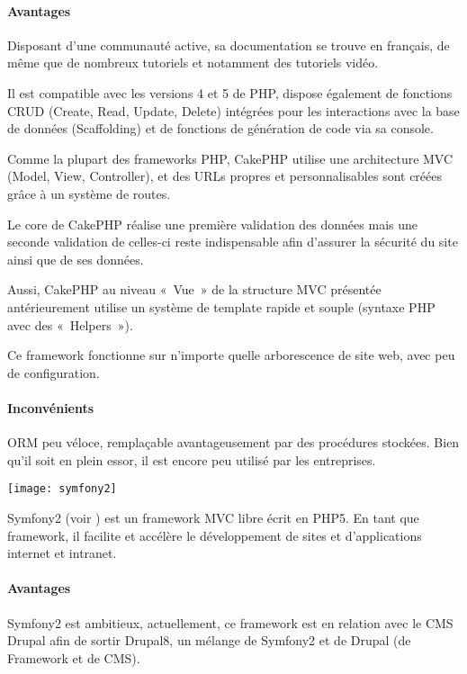 \paragraph{Avantages}
Disposant d'une communauté active, sa documentation se trouve en français, de même que de nombreux tutoriels et notamment des tutoriels vidéo.

Il est compatible avec les versions 4 et 5 de PHP, dispose également de fonctions CRUD (Create, Read, Update, Delete) intégrées pour les interactions avec la base de données (Scaffolding) et de fonctions de génération de code via sa console.

Comme la plupart des frameworks PHP, CakePHP utilise une architecture MVC (Model, View, Controller), et des URLs propres et personnalisables sont créées grâce à un système de routes.

Le core de CakePHP réalise une première validation des données mais une seconde validation de celles-ci reste indispensable afin d'assurer la sécurité du site ainsi que de ses données.

Aussi, CakePHP au niveau «~Vue~» de la structure MVC présentée antérieurement utilise un système de template rapide et souple (syntaxe PHP avec des «~Helpers~»).

Ce framework fonctionne sur n’importe quelle arborescence de site web, avec peu de configuration.

\paragraph{Inconvénients}
ORM peu véloce, remplaçable avantageusement par des procédures stockées.
Bien qu'il soit en plein essor, il est encore peu utilisé par les entreprises.


\begin{center}\texttt{[image: symfony2]}\end{center}

Symfony2 (voir \cite{symfony}) est un framework MVC libre écrit en PHP5. En tant que framework, il facilite et accélère le développement de sites et d'applications internet et intranet.

\paragraph{Avantages}
Symfony2 est ambitieux, actuellement, ce framework est en relation avec le CMS Drupal afin de sortir Drupal8, un mélange de Symfony2 et de Drupal (de Framework et de CMS).

